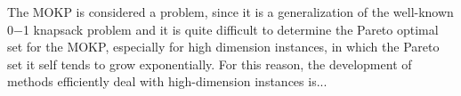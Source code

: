 The MOKP is considered a \nphard{} problem, since it is a generalization
of the well-known 0$-$1 knapsack problem and
it is quite difficult to determine the Pareto optimal set for the MOKP,
especially for high dimension instances, in which the Pareto set it self tends
to grow exponentially.
For this reason, the development of methods efficiently deal with high-dimension
instances is...


